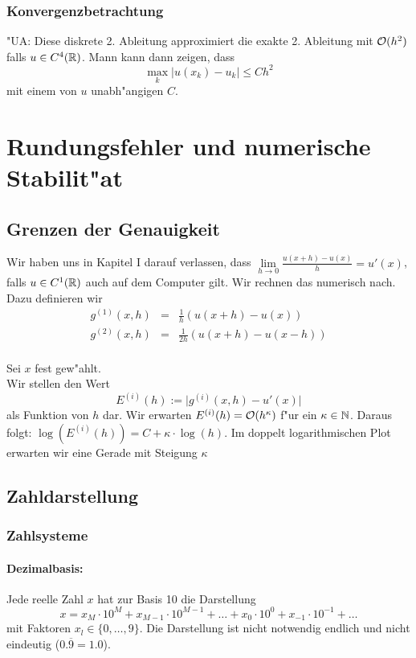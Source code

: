 \documentclass{scrartcl}
\begin{document}
\subsubsection{Konvergenzbetrachtung}
"UA: Diese diskrete 2. Ableitung approximiert die exakte 2. Ableitung mit $\mathcal{O} (h^2)$ falls $u \in C^4(\mathbb{R})$. Mann kann dann zeigen, dass
$$ \max\limits_{k} \vert u(x_k) - u_k \vert \leq C h^2$$
mit einem von $u$ unabh"angigen $C$.

\section{Rundungsfehler und numerische Stabilit"at}

\subsection{Grenzen der Genauigkeit}

Wir haben uns in Kapitel I darauf verlassen, dass $\lim\limits_{h \rightarrow 0} \frac{u(x + h) - u(x)}{h} = u'(x)$, falls $u \in C^1(\mathbb{R})$ auch auf dem Computer gilt. Wir rechnen das numerisch nach. Dazu definieren wir 
\begin{eqnarray*}
g^{(1)}(x,h) & = & \frac{1}{h} \left( u(x+h) - u(x) \right)\\
g^{(2)}(x,h) & = & \frac{1}{2h} \left( u(x+h) - u(x-h) \right)
\end{eqnarray*} \\
 Sei $x$ fest gew"ahlt. \\ Wir stellen den Wert
$$ E^{(i)} (h) := \vert g^{(i)} (x,h) - u'(x) \vert $$
als Funktion von $h$ dar. Wir erwarten $E^{(i)} (h) = \mathcal{O} (h^{\kappa})$ f"ur ein $\kappa \in \mathbb{N}$. Daraus folgt: $\log(E^{(i)} (h) ) = C + \kappa \cdot \log(h)$. Im doppelt logarithmischen Plot erwarten wir eine Gerade mit Steigung $\kappa$

\subsection{Zahldarstellung}

\subsubsection{Zahlsysteme}

\paragraph*{Dezimalbasis:} Jede reelle Zahl $x$ hat zur Basis 10 die Darstellung 
$$ x = x_M \cdot 10^M + x_{M-1}\cdot 10^{M-1} + \ldots + x_0 \cdot 10^0 + x_{-1} \cdot  10^{-1} + \ldots $$
mit Faktoren $x_l \in \{ 0, \ldots, 9 \}$. Die Darstellung ist nicht notwendig endlich und nicht eindeutig ($0.\overline{9} = 1.0$).
\end{document}
